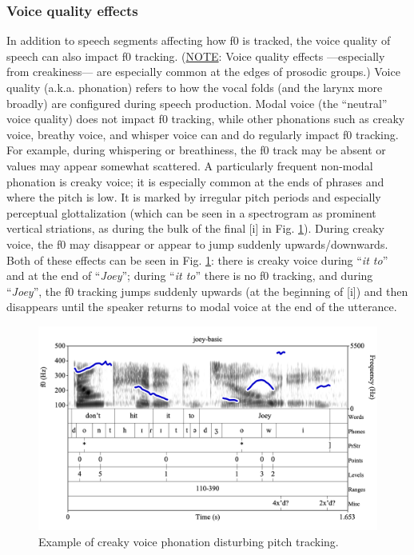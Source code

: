 \documentclass[11pt, twoside]{memoir}
\def\langtext#1{\textit{#1}}
\begin{document}
\subsubsection{Voice quality effects}\label{sec:voice-quality-effects}
In addition to speech segments affecting how f0 is tracked, the voice quality of speech can also impact f0 tracking. (\uline{NOTE}: Voice quality effects —especially from creakiness— are especially common at the edges of prosodic groups.) Voice quality (a.k.a. phonation) refers to how the vocal folds (and the larynx more broadly) are configured during speech production. Modal voice (the “neutral” voice quality) does not impact f0 tracking, while other phonations such as creaky voice, breathy voice, and whisper voice can and do regularly impact f0 tracking. For example, during whispering or breathiness, the f0 track may be absent or values may appear somewhat scattered. 
A particularly frequent non-modal phonation is creaky voice; it is especially common at the ends of phrases and where the pitch is low. It is marked by irregular pitch periods and especially perceptual glottalization (which can be seen in a spectrogram as prominent vertical striations, as during the bulk of the final [i] in Fig. \ref{fig:joey f0-tracking}). During creaky voice, the f0 may disappear or appear to jump suddenly upwards\slash downwards. Both of these effects can be seen in Fig. \ref{fig:joey f0-tracking}: there is creaky voice during “\langtext{it to}” and at the end of “\langtext{Joey}”; during “\langtext{it to}” there is no f0 tracking, and during “\langtext{Joey}”, the f0 tracking jumps suddenly upwards (at the beginning of [i]) and then disappears until the speaker returns to modal voice at the end of the utterance.
\begin{figure}[H]
\centering
\includegraphics[width=.875\linewidth]{Appendix-joey.png}
\caption{Example of creaky voice phonation disturbing pitch tracking.
\label{fig:joey f0-tracking}
}
\end{figure}
\end{document}
